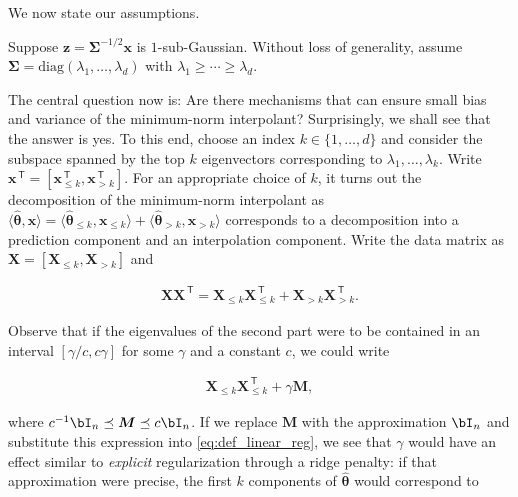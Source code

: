 We now state our assumptions.

\begin{assumption}
	\label{assmpt:linear_reg}
	Suppose ${\boldsymbol z}={\boldsymbol \Sigma}^{-1/2} {\boldsymbol x}$ is $1$-sub-Gaussian. Without loss of generality, assume
    ${\boldsymbol \Sigma}=\text{diag}(\lambda_1, \ldots,\lambda_d)$
    with $\lambda_1\geq  \cdots \ge\lambda_d$.
\end{assumption}

The central question now is: Are there mechanisms that can ensure small bias and variance of the minimum-norm interpolant? Surprisingly, we shall see that the answer is yes. To this end, choose an index $k\in\{1,\ldots,d\}$ and consider the subspace spanned by the top $k$ eigenvectors corresponding to $\lambda_1,\ldots,\lambda_k$. Write ${\boldsymbol x}^\ensuremath{{\scriptscriptstyle\mathsf{\,T}}}=[{\boldsymbol x}_{\leq
k}^\ensuremath{{\scriptscriptstyle\mathsf{\,T}}},{\boldsymbol x}_{> k}^\ensuremath{{\scriptscriptstyle\mathsf{\,T}}}]$.  For an appropriate choice of $k$, it turns out the decomposition of the minimum-norm interpolant as
$\langle\widehat{\boldsymbol \theta},{\boldsymbol x}\rangle = \langle\widehat{\boldsymbol \theta}_{\leq k},{\boldsymbol x}_{\leq
k}\rangle + \langle\widehat{\boldsymbol \theta}_{> k},{\boldsymbol x}_{> k}\rangle$ corresponds to a decomposition into a prediction component and an interpolation component. Write the data matrix as
${\boldsymbol X} = [{\boldsymbol X}_{\leq k}, {\boldsymbol X}_{>k}]$ and

\begin{align}
	\label{eq:splitting_two_parts}
	{\boldsymbol X}{\boldsymbol X}^\ensuremath{{\scriptscriptstyle\mathsf{\,T}}} = {\boldsymbol X}_{\leq k}{\boldsymbol X}_{\leq k}^\ensuremath{{\scriptscriptstyle\mathsf{\,T}}} + {\boldsymbol X}_{> k}{\boldsymbol X}_{> k}^\ensuremath{{\scriptscriptstyle\mathsf{\,T}}}.
\end{align}

Observe that if the eigenvalues of the second part were to be contained in an interval $[\gamma/c,c \gamma]$ for some $\gamma$ and a constant $c$, we could write

\begin{align}
	\label{eq:replace_tail_reg}
	{\boldsymbol X}_{\leq k}{\boldsymbol X}_{\leq k}^\ensuremath{{\scriptscriptstyle\mathsf{\,T}}} + \gamma {\boldsymbol M},
\end{align}

where $c^{-1}\bI_n\preceq{\boldsymbol M}\preceq c\bI_n$.  If we replace
${\boldsymbol M}$ with the approximation $\bI_n$ and substitute this expression into \eqref{eq:def_linear_reg}, we see that $\gamma$ would have an effect similar to \emph{explicit} regularization through a ridge penalty: if that approximation were precise, the first $k$ components of $\widehat{\boldsymbol \theta}$ would correspond to


